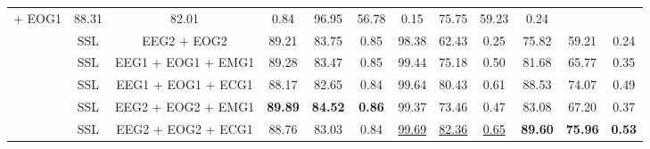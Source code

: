 \begin{table*}[!htbp]
{{\begin{tabular}{c|c|c|ccc|ccc|ccc}
  + EOG1                              & 88.31          & 82.01          & 0.84                                                    & 96.95          & 56.78          & 0.15                                        & 75.75          & 59.23          & 0.24                                           \\
                                                                               & SSL                                    & EEG2
  + EOG2                              & 89.21          & 83.75          & 0.85                                                    & 98.38          & 62.43          & 0.25                                        & 75.82          & 59.21          & 0.24                                           \\
                                                                               & SSL                                    & EEG1 + EOG1 + EMG1                         & 89.28          & 83.47          & 0.85                                                    & 99.44          & 75.18          & 0.50                                        & 81.68          & 65.77          & 0.35                                           \\
                                                                               & SSL                                    & EEG1 + EOG1 + ECG1                         & 88.17          & 82.65          & 0.84                                                    & 99.64          & 80.43          & 0.61                                        & 88.53          & 74.07          & 0.49                                           \\
                                                                               & SSL                                    & EEG2 + EOG2 + EMG1                         & \textbf{89.89} & \textbf{84.52} & \textbf{0.86}                                           & 99.37          & 73.46          & 0.47                                        & 83.08          & 67.20          & 0.37                                           \\
                                                                               & SSL                                    & EEG2 + EOG2 + ECG1                         & 88.76          & 83.03          & 0.84                                                    & \uline{99.69}  & \uline{82.36}  & \uline{0.65}                                & \textbf{89.60} & \textbf{75.96} & \textbf{0.53}                                  \\

\end{tabular}}}
\end{table*}
